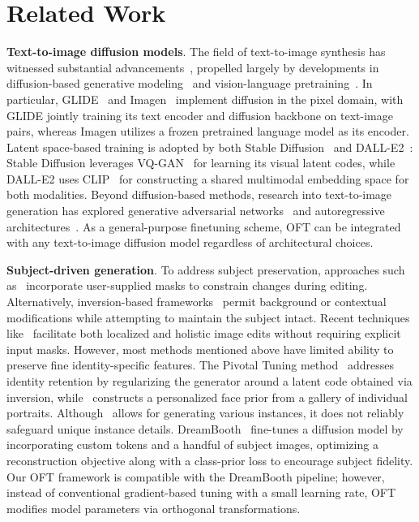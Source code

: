 \section{Related Work}

\textbf{Text-to-image diffusion models}. The field of text-to-image synthesis has witnessed substantial advancements~\cite{saharia2022photorealistic,ramesh2022hierarchical,rombach2022high,gu2022vector,nichol2022glide}, propelled largely by developments in diffusion-based generative modeling~\cite{ho2020denoising,song2021score,song2021denoising,dhariwal2021diffusion} and vision-language pretraining~\cite{su2020vlbert,lu2019vilbert,radford2021learning,wang2021simvlm,li2022blip,li2023blip,alayrac2022flamingo,schuhmann2022laion}. In particular, GLIDE~\cite{nichol2022glide} and Imagen~\cite{saharia2022photorealistic} implement diffusion in the pixel domain, with GLIDE jointly training its text encoder and diffusion backbone on text-image pairs, whereas Imagen utilizes a frozen pretrained language model as its encoder. Latent space-based training is adopted by both Stable Diffusion~\cite{rombach2022high} and DALL-E2~\cite{ramesh2022hierarchical}: Stable Diffusion leverages VQ-GAN~\cite{esser2021taming} for learning its visual latent codes, while DALL-E2 uses CLIP~\cite{radford2021learning} for constructing a shared multimodal embedding space for both modalities. Beyond diffusion-based methods, research into text-to-image generation has explored generative adversarial networks~\cite{reed2016generative,zhang2017stackgan,xu2018attngan,li2019controllable} and autoregressive architectures~\cite{ramesh2021zero,ding2021cogview,wu2022nuwa,yuscaling}. As a general-purpose finetuning scheme, OFT can be integrated with any text-to-image diffusion model regardless of architectural choices.

\textbf{Subject-driven generation}. To address subject preservation, approaches such as~\cite{avrahami2022blended,nichol2022glide} incorporate user-supplied masks to constrain changes during editing. Alternatively, inversion-based frameworks~\cite{choi2021ilvr,dhariwal2021diffusion,ramesh2022hierarchical,gal2022image} permit background or contextual modifications while attempting to maintain the subject intact. Recent techniques like~\cite{hertz2022prompt} facilitate both localized and holistic image edits without requiring explicit input masks. However, most methods mentioned above have limited ability to preserve fine identity-specific features. The Pivotal Tuning method~\cite{roich2022pivotal} addresses identity retention by regularizing the generator around a latent code obtained via inversion, while~\cite{nitzan2022mystyle} constructs a personalized face prior from a gallery of individual portraits. Although~\cite{casanova2021instance} allows for generating various instances, it does not reliably safeguard unique instance details. DreamBooth~\cite{ruiz2023dreambooth} fine-tunes a diffusion model by incorporating custom tokens and a handful of subject images, optimizing a reconstruction objective along with a class-prior loss to encourage subject fidelity. Our OFT framework is compatible with the DreamBooth pipeline; however, instead of conventional gradient-based tuning with a small learning rate, OFT modifies model parameters via orthogonal transformations.

